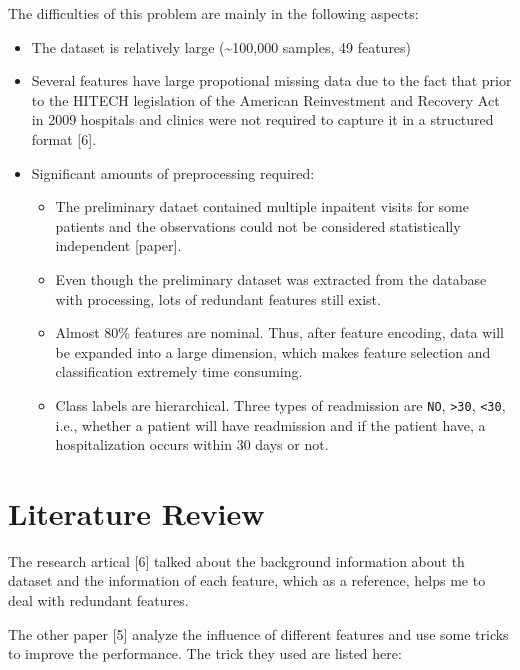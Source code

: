 \documentclass[]{article}
\begin{document}
The difficulties of this problem are mainly in the following aspects:

\begin{itemize}
\itemsep1pt\parskip0pt
\item
  The dataset is relatively large (\textasciitilde{}100,000 samples, 49
  features)
\item
  Several features have large propotional missing data due to the fact
  that prior to the HITECH legislation of the American Reinvestment and
  Recovery Act in 2009 hospitals and clinics were not required to
  capture it in a structured format {[}6{]}.
\item
  Significant amounts of preprocessing required:

  \begin{itemize}
  \itemsep1pt\parskip0pt
  \item
    The preliminary dataet contained multiple inpaitent visits for some
    patients and the observations could not be considered statistically
    independent {[}paper{]}.
  \item
    Even though the preliminary dataset was extracted from the database
    with processing, lots of redundant features still exist.
  \item
    Almost 80\% features are nominal. Thus, after feature encoding, data
    will be expanded into a large dimension, which makes feature
    selection and classification extremely time consuming.
  \item
    Class labels are hierarchical. Three types of readmission are
    \texttt{NO}, \texttt{\textgreater{}30}, \texttt{\textless{}30},
    i.e., whether a patient will have readmission and if the patient
    have, a hospitalization occurs within 30 days or not.
  \end{itemize}
\end{itemize}

\section{Literature Review}\label{literature-review}

The research artical {[}6{]} talked about the background information
about th dataset and the information of each feature, which as a
reference, helps me to deal with redundant features.

The other paper {[}5{]} analyze the influence of different features and
use some tricks to improve the performance. The trick they used are
listed here:
\end{document}
